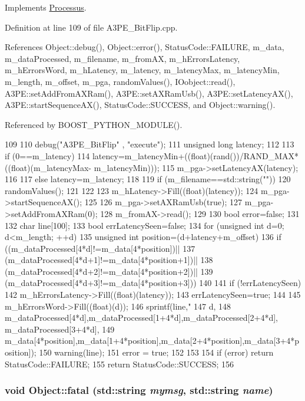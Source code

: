 Implements \hyperlink{classProcessus_a63767a63a1fb0055c5aa45b21a4a5d58}{Processus}.

Definition at line 109 of file A3PE\_\-BitFlip.cpp.

References Object::debug(), Object::error(), StatusCode::FAILURE, m\_\-data, m\_\-dataProcessed, m\_\-filename, m\_\-fromAX, m\_\-hErrorsLatency, m\_\-hErrorsWord, m\_\-hLatency, m\_\-latency, m\_\-latencyMax, m\_\-latencyMin, m\_\-length, m\_\-offset, m\_\-pga, randomValues(), IOobject::read(), A3PE::setAddFromAXRam(), A3PE::setAXRamUsb(), A3PE::setLatencyAX(), A3PE::startSequenceAX(), StatusCode::SUCCESS, and Object::warning().

Referenced by BOOST\_\-PYTHON\_\-MODULE().


\begin{DoxyCode}
109                                    {
110   debug("A3PE_BitFlip" , "execute");
111   unsigned long latency;    
112 
113   if (0==m_latency){
114         latency=m_latencyMin+((float)(rand())/RAND_MAX*((float)(m_latencyMax-
      m_latencyMin)));
115         m_pga->setLatencyAX(latency);
116   }
117   else latency=m_latency;
118 
119   if (m_filename==std::string("")){
120       randomValues();
121   }
122   
123   m_hLatency->Fill((float)(latency));
124   m_pga->startSequenceAX();
125 
126   m_pga->setAXRamUsb(true);
127   m_pga->setAddFromAXRam(0);
128   m_fromAX->read();
129 
130   bool error=false;
131 
132   char line[100];
133   bool errLatencySeen=false;
134   for (unsigned int d=0; d<m_length; ++d){
135     unsigned int position=(d+latency+m_offset)%
136     if ((m_dataProcessed[4*d]!=m_data[4*position])||
137     (m_dataProcessed[4*d+1]!=m_data[4*position+1])||
138     (m_dataProcessed[4*d+2]!=m_data[4*position+2])||
139     (m_dataProcessed[4*d+3]!=m_data[4*position+3]))
140       {
141         if (!errLatencySeen) {
142             m_hErrorsLatency->Fill((float)(latency));
143             errLatencySeen=true;
144         }
145         m_hErrorsWord->Fill((float)(d));
146     sprintf(line,"%
147         d,
148         m_dataProcessed[4*d],m_dataProcessed[1+4*d],m_dataProcessed[2+4*d],
      m_dataProcessed[3+4*d],
149         m_data[4*position],m_data[1+4*position],m_data[2+4*position],m_data[3+4*p
      osition]);
150     warning(line);
151       error = true;
152       }
153   }
154   if (error) return StatusCode::FAILURE;
155   return StatusCode::SUCCESS;
156 }
\end{DoxyCode}
\hypertarget{classObject_ae62acd3d09f716220f75f252dc38bc9a}{
\subsubsection[{fatal}]{\setlength{\rightskip}{0pt plus 5cm}void Object::fatal (std::string {\em mymsg}, \/  std::string {\em name})}}
\label{classObject_ae62acd3d09f716220f75f252dc38bc9a}


